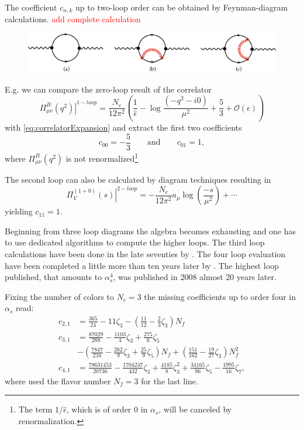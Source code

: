 \documentclass[../../index.tex]{subfiles}
\begin{document}
The coefficient $c_{n,k}$ up to two-loop order can be
obtained by Feynman-diagram calculations.
\textcolor{red}{add complete calculation}
\begin{figure}
  \centering
  \includegraphics[width=\textwidth]{./images/correlatorLoopDiagrams.eps}
\end{figure}
E.g. we can compare the zero-loop result of the correlator \cite{Jamin2006}
\begin{equation}
  \left. \Pi^B_{\mu\nu}(q^2) \right\rvert^{1-loop} = \frac{N_c}{12\pi^2} \left( \frac{1}{\hat \epsilon} - \log\frac{(-q^2 - i0)}{\mu^2} + \frac{5}{3} + \mathcal{O}(\epsilon) \right)
\end{equation}
with \cref{eq:correlatorExpansion} and extract the first two coefficients 
\begin{equation}
  c_{00} = - \frac{5}{3} \qquad \text{and} \qquad c_{01} = 1,
\end{equation}
where $\Pi^B_{\mu\nu}(q^2)$ is not renormalized\footnote{The term $1/ \hat
  \epsilon$, which is of order 0 in $\alpha_s$, will be canceled by renormalization.}

The second loop can also be calculated by diagram techniques resulting in \cite{Boito2011}
\begin{equation}
  \left. \Pi_V^{(1+0)}(s) \right\rvert^{2-loop} = -\frac{N_c}{12\pi^2} a_\mu \log(\frac{-s}{\mu^2}) + \cdots
\end{equation}
yielding  $c_{11} = 1$.

Beginning from three loop diagrams the algebra becomes exhausting and one has to
use dedicated algorithms to compute the higher loops. The third loop
calculations have been done in the late seventies by
\cite{Chetyrkin1979,Dine1979,Celmaster1979}. The four loop evaluation have been
completed a little more than ten years later by
\cite{Gorishnii1990,Surguladze1990}. The highest loop published, that amounts
to $\alpha_s^4$, was published in 2008 \cite{Baikov2008} almost 20 years later.

Fixing the number of colors to $N_c=3$ the missing coefficients up to order four
in $\alpha_s$ read:
\begin{equation}
  \label{eq:adlerCoefficients}
  \begin{split}
    c_{2,1} &= \frac{365}{24} - 11 \zeta_3 - \left( \frac{11}{12} - \frac{2}{3}\zeta_3 \right) N_f \\ 
    c_{3,1} &= \frac{87029}{288} - \frac{1103}{4} \zeta_3 + \frac{275}{6}\zeta_5 \\
           &- \left( \frac{7847}{216} - \frac{262}{9} \zeta_3 + \frac{25}{9} \zeta_5 \right) N_f + \left( \frac{151}{162} - \frac{19}{27}\zeta_3\right)N_f^2 \\
   c_{4,1} &= \frac{78631453}{20736} - \frac{1704247}{432}\zeta_3 + \frac{4185}{8}\zeta_3^2 + \frac{34165}{96}\zeta_5 - \frac{1995}{16}\zeta_7,
  \end{split}
\end{equation}
where used the flavor number $N_f=3$ for the last line.
\end{document}

